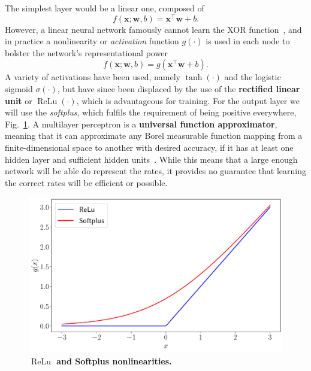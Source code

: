 \noindent
The simplest layer would be a linear one, composed of
\begin{equation}
f(\mathbf{x}; \mathbf{w}, b) = \mathbf{x}^\intercal \mathbf{w} + b.
\end{equation}
However, a linear neural network famously cannot learn the XOR function~\cite{minsky2017perceptrons}, and in practice a nonlinearity or \emph{activation} function $g(\cdot)$ is used in each node to bolster the network's representational power
\begin{equation}
f(\mathbf{x}; \mathbf{w}, b) = g\left(\mathbf{x}^\intercal \mathbf{w} + b\right).
\end{equation}
A variety of activations have been used, namely $\tanh(\cdot)$ and the logistic sigmoid $\sigma(\cdot)$, but have since been displaced by the use of the \textbf{rectified linear unit} or $\operatorname{ReLu}(\cdot)$, which is advantageous for training. For the output layer we will use the \emph{softplus}, which fulfils the requirement of being positive everywhere, Fig.~\ref{fig:activations}. A multilayer perceptron is a \textbf{universal function approximator}, meaning that it can approximate any Borel measurable function mapping from a finite-dimensional space to another with desired accuracy, if it has at least one hidden layer and sufficient hidden units~\cite{leshno1993multilayer}. While this means that a large enough network will be able do represent the rates, it provides no guarantee that learning the correct rates will be efficient or possible. 
\begin{figure}[H]
	\centering
	\includegraphics[width=0.7\linewidth]{Chapter4/Figs/Vector/activations}
	\caption[$\operatorname{ReLu}$ and Softmax nonlinearities.]{\textbf{$\operatorname{ReLu}$ and Softplus nonlinearities.}}
	\label{fig:activations}
\end{figure}

